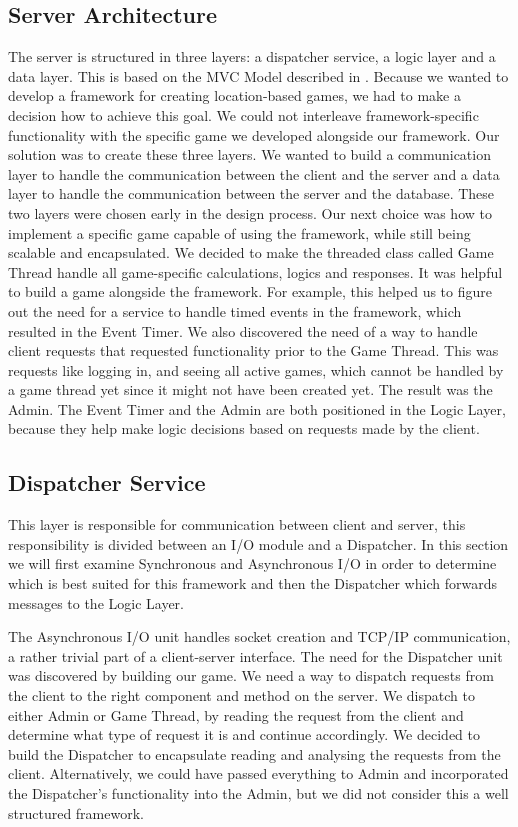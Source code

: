 \subsection{Server Architecture}
\label{sec:server}

The server is structured in three layers: a dispatcher service, a logic layer and a data layer. This is based on the MVC Model described in . Because we wanted to develop a framework for creating location-based games, we had to make a decision how to achieve this goal. We could not interleave framework-specific functionality with the specific game we developed alongside our framework. Our solution was to create these three layers. We wanted to build a communication layer to handle the communication between the client and the server and a data layer to handle the communication between the server and the database. These two layers were chosen early in the design process. Our next choice was how to implement a specific game capable of using the framework, while still being scalable and encapsulated. We decided to make the threaded class called Game Thread handle all game-specific calculations, logics and responses. 
It was helpful to build a game alongside the framework. For example, this helped us to figure out the need for a service to handle timed events in the framework, which resulted in the Event Timer. We also discovered the need of a way to handle client requests that requested functionality prior to the Game Thread. This was requests like logging in, and seeing all active games, which cannot be handled by a game thread yet since it might not have been created yet. The result was the Admin. The Event Timer and the Admin are both positioned in the Logic Layer, because they help make logic decisions based on requests made by the client. 



\subsection{Dispatcher Service}
This layer is responsible for communication between client and server, this responsibility is divided between an I/O module and a Dispatcher. In this section we will first examine Synchronous and Asynchronous I/O in order to determine which is best suited for this framework and then the Dispatcher which forwards messages to the Logic Layer. 

The Asynchronous I/O unit handles socket creation and TCP/IP communication, a rather trivial part of a client-server interface. The need for the Dispatcher unit was discovered by building our game. We need a way to dispatch requests from the client to the right component and method on the server. We dispatch to either Admin or Game Thread, by reading the request from the client and determine what type of request it is and continue accordingly. We decided to build the Dispatcher to encapsulate reading and analysing the requests from the client. Alternatively, we could have passed everything to Admin and incorporated the Dispatcher's functionality into the Admin, but we did not consider this a well structured framework.

